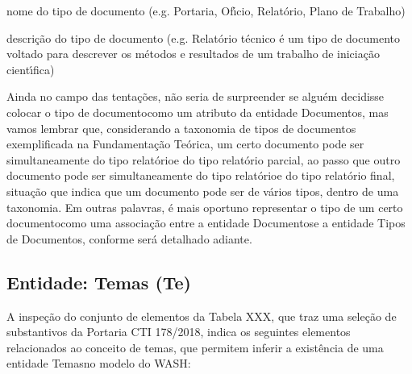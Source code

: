 \documentclass[
12pt,		%
openright,	%
twoside,  %
a4paper,			%
chapter=TITLE,		%
english,			%
french,				%
spanish,			%
brazil				%
]{USPSC-classe/USPSC}
\begin{document}
\begin{alineas}
\item nome do tipo de documento (e.g. Portaria, Of\'{\i}cio, Relat\'orio, Plano de Trabalho)
\item descri\c{c}\~ao do tipo de documento (e.g. \textquotedbl Relat\'orio t\'ecnico \'e um tipo de documento voltado para descrever os m\'etodos e resultados de um trabalho de inicia\c{c}\~ao cient\'{\i}fica\textquotedbl )
\end{alineas}

Ainda no campo das \textquotedbl tenta\c{c}\~oes\textquotedbl , n\~ao seria de surpreender se algu\'em decidisse colocar o \textquotedbl tipo de documento\textquotedbl  como um atributo da entidade \textquotedbl Documentos\textquotedbl , mas vamos lembrar que, considerando a taxonomia de tipos de documentos exemplificada na Fundamenta\c{c}\~ao Te\'orica, um certo documento pode ser simultaneamente do tipo \textquotedbl relat\'orio\textquotedbl  e do tipo \textquotedbl relat\'orio parcial\textquotedbl , ao passo que outro documento pode ser simultaneamente do tipo \textquotedbl relat\'orio\textquotedbl  e do tipo \textquotedbl relat\'orio final\textquotedbl , situa\c{c}\~ao que indica que um documento pode ser de v\'arios tipos, dentro de uma taxonomia. Em outras palavras, \'e mais oportuno representar o \textquotedbl tipo de um certo documento\textquotedbl  como uma associa\c{c}\~ao entre a entidade \textquotedbl Documentos\textquotedbl  e a entidade \textquotedbl Tipos de Documentos\textquotedbl , conforme ser\'a detalhado adiante.









\subsection[Entidade: Temas (Te)]{Entidade: Temas (Te)}\label{Entidade: Temas (Te)}
A inspe\c{c}\~ao do conjunto de elementos da Tabela XXX, que traz uma sele\c{c}\~ao de substantivos da Portaria CTI 178/2018, indica os seguintes elementos relacionados ao conceito de \textquotedbl temas\textquotedbl , que permitem inferir a exist\^encia de uma entidade \textquotedbl Temas\textquotedbl  no modelo do WASH:










\noindent\begin{center}\mbox{\centering{}}\end{center}
\end{document}
